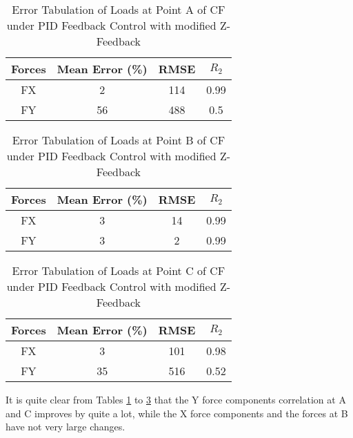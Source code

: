 \begin{table}[h!]
	\centering
	\begin{tabular}{ |c|c|c|c| } 
		\hline
		Forces & Mean Error (\%) & RMSE & $R_2$\\ 
		\hline
		FX & 2&114&0.99\\ 
		FY & 56&488&0.5 \\ 
		\hline
	\end{tabular}
	\caption{Error Tabulation of Loads at Point A of CF under PID Feedback Control with modified Z-Feedback}
	\label{tab:pureFeedbkPIDA}
\end{table}

\begin{table}[h!]
	\centering
	\begin{tabular}{ |c|c|c|c| } 
		\hline
		Forces & Mean Error (\%) & RMSE & $R_2$\\ 
		\hline
		FX & 3&14&0.99\\
		FY&3&2&0.99\\
		\hline
	\end{tabular}
	\caption{Error Tabulation of Loads at Point B of CF under PID Feedback Control with modified Z-Feedback}
	\label{tab:pureFeedbkPIDB}
\end{table}

\begin{table}[h!]
	\centering
	\begin{tabular}{ |c|c|c|c| } 
		\hline
		Forces & Mean Error (\%) & RMSE & $R_2$\\ 
		\hline
		FX & 3&101&0.98\\ 
		FY & 35&516&0.52 \\ 
		\hline
	\end{tabular}
	\caption{Error Tabulation of Loads at Point C of CF under PID Feedback Control with modified Z-Feedback}
	\label{tab:pureFeedbkPIDC}
\end{table}


It is quite clear from Tables \ref{tab:pureFeedbkPIDA} to \ref{tab:pureFeedbkPIDC} that the Y force components correlation at A and C improves by quite a lot, while the X force components and the forces at B have not very large changes. 

